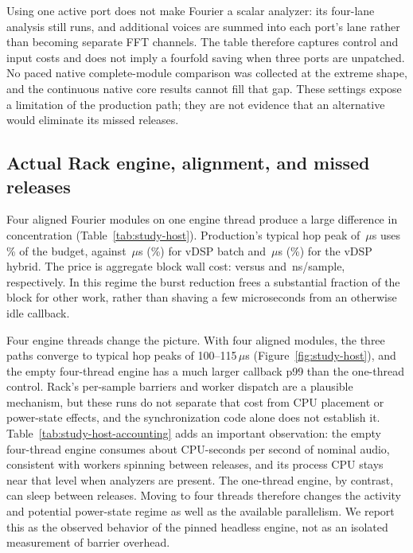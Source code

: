 Using one active port does not make Fourier a scalar analyzer: its four-lane
analysis still runs, and additional voices are summed into each port's lane
rather than becoming separate FFT channels. The table therefore captures
control and input costs and does not imply a fourfold saving when three ports
are unpatched. No paced native complete-module comparison was collected at the
extreme shape, and the continuous native core results cannot fill that gap.
These settings expose a limitation of the production path; they are not
evidence that an alternative would eliminate its missed releases.

\subsection{Actual Rack engine, alignment, and missed releases}
Four aligned Fourier modules on one engine thread produce a large difference
in concentration (Table~\ref{tab:study-host}). Production's typical hop peak
of \StudyHostCorePeak\,$\mu$s uses \StudyHostCoreBudgetPercent\% of the
budget, against \StudyHostBatchPeak\,$\mu$s (\StudyHostBatchBudgetPercent\%)
for vDSP batch and \StudyHostHybridPeak\,$\mu$s
(\StudyHostHybridBudgetPercent\%) for the vDSP hybrid. The price is aggregate
block wall cost: \StudyHostCoreCost{} versus \StudyHostBatchCost{} and
\StudyHostHybridCost\,ns/sample, respectively. In this regime the burst
reduction frees a substantial fraction of the block for other work, rather
than shaving a few microseconds from an otherwise idle callback.



Four engine threads change the picture. With four aligned modules, the three
paths converge to typical hop peaks of 100--115\,$\mu$s
(Figure~\ref{fig:study-host}), and the empty four-thread engine has a much
larger callback p99 than the one-thread control. Rack's per-sample barriers
and worker dispatch are a plausible mechanism, but these runs do not separate
that cost from CPU placement or power-state effects, and the synchronization
code alone does not establish it. Table~\ref{tab:study-host-accounting} adds
an important observation: the empty four-thread engine consumes about
\StudyEmptyCpuCores{} CPU-seconds per second of nominal audio, consistent with
workers spinning between releases, and its process CPU stays near that level
when analyzers are present. The one-thread engine, by contrast, can sleep
between releases. Moving to four threads therefore changes the activity and
potential power-state regime as well as the available parallelism. We report
this as the observed behavior of the pinned headless engine, not as an
isolated measurement of barrier overhead.

